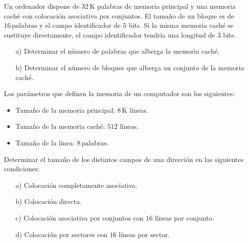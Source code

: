 \begin{ejercicio}
    Un ordenador dispone de \(32 \, \text{K}\) palabras de memoria principal y una memoria caché con colocación asociativa por conjuntos. El tamaño de un bloque es de \(16 \, \text{palabras}\) y el campo identificador de \(5\) bits. Si la misma memoria caché se sustituye directamente, el campo identificador tendría una longitud de \(3\) bits.
    \begin{itemize}
        \item[a)] Determinar el número de palabras que alberga la memoria caché.
        \item[b)] Determinar el número de bloques que alberga un conjunto de la memoria caché.
    \end{itemize}
\end{ejercicio}

\begin{ejercicio}
    Los parámetros que definen la memoria de un computador son los siguientes:
    \begin{itemize}
        \item Tamaño de la memoria principal: \(8 \, \text{K}\) líneas.
        \item Tamaño de la memoria caché: \(512\) líneas.
        \item Tamaño de la línea: \(8 \, \text{palabras}\).
    \end{itemize}
    Determinar el tamaño de los distintos campos de una dirección en las siguientes condiciones:
    \begin{itemize}
        \item[a)] Colocación completamente asociativa.
        \item[b)] Colocación directa.
        \item[c)] Colocación asociativa por conjuntos con \(16\) líneas por conjunto.
        \item[d)] Colocación por sectores con \(16\) líneas por sector.
    \end{itemize}
\end{ejercicio}

